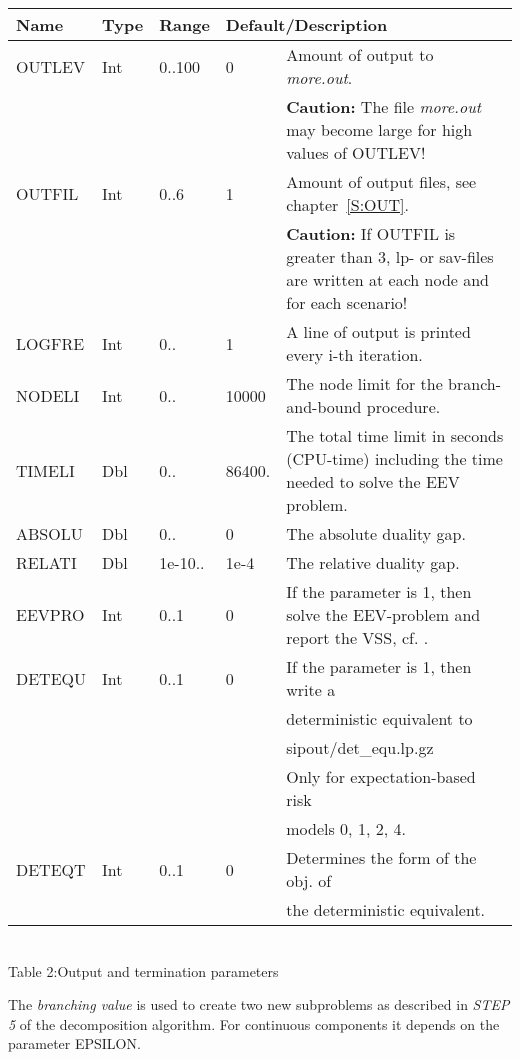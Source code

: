 \documentclass[11pt,draft]{article}
\newcommand{\+}{{\ti{+}}}
\newcommand{\1}{{\ti{1}}}
\begin{document}
\begin{center}
\begin{tabular}{|llllp{6.4cm}|} 
\hline
Name&Type&Range&\multicolumn{2}{l|}{Default/Description}\\ \hline
OUTLEV&Int&0..100&0&Amount of output to {\it more.out}.\\&&&& {\bf Caution:} The file {\it more.out} may become
large for high values of OUTLEV!\medskip\\  
OUTFIL&Int&0..6&1&Amount of output files, see
chapter~\ref{S:OUT}.\\&&&& {\bf Caution:} If OUTFIL is greater than 3, lp- or sav-files are written at each node
and for each scenario! \medskip\\  
LOGFRE&Int&0..&1&A line of output is printed every i-th iteration. \medskip\\
NODELI&Int&0..&10000&The node limit for the branch-and-bound procedure. \medskip\\  
TIMELI&Dbl&0..&86400.&The total time limit in seconds (CPU-time) 
including the time needed to solve the EEV problem. \medskip\\ 
ABSOLU&Dbl&0..&0&The absolute duality gap.\medskip\\ 
RELATI&Dbl&1e-10..&1e-4&The relative duality gap.\\
EEVPRO&Int&0..1&0&If the parameter is 1, then solve the EEV-problem and report the VSS, cf. \cite{bir}.\medskip\\  
DETEQU&Int&0..1&0&If the parameter is 1, then write a \\&&&&deterministic equivalent to\\&&&& sipout/det\_equ.lp.gz\\&&&& Only for expectation-based risk\\&&&& models 0, 1, 2, 4.\\
DETEQT&Int&0..1&0&Determines the form of the obj. of\\&&&& the deterministic equivalent.\\
\hline
\end{tabular}\\[0.5em]
{Table 2:\quad Output and termination parameters}
\end{center}
%

The {\it branching value} is used to create two new subproblems as described in {\em STEP 5} of the
decomposition algorithm. For continuous components it depends on the parameter EPSILON.
\end{document}
